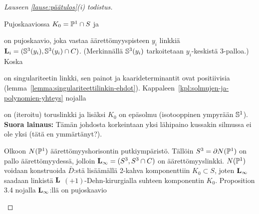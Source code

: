 \begin{proof}[Lauseen \ref{lause:päätulos}(i) todistus]
\begin{center}
    \end{center}
    Pujoskaaviossa $K_0=\P^1\cap S$ ja 
    on pujoskaavio, joka vastaa äärettömyyspisteen $y_i$ linkkiä $\linkki_i=(\S^3(y_i),\S^3(y_i)\cap C)$. (Merkinnällä $\S^3(y_i)$ tarkoitetaan $y_i$-keskistä 3-palloa.) Koska
    on singulariteetin linkki, sen painot ja kaarideterminantit ovat positiivisia (lemma~\ref{lemma:singulariteettilinkin-ehdot}). Kappaleen~\ref{kpl:solmujen-ja-polynomien-yhteys} nojalla
    on (iteroitu) toruslinkki ja lisäksi $K_0$ on epäsolmu (isotooppinen ympyrään $\S^1$). \textbf{Suora lainaus:} Tämän johdosta korkeintaan yksi lähipaino kussakin silmussa ei ole yksi (tätä en ymmärtänyt?).

    Olkoon $N(\P^1)$ äärettömyyshorisontin putkiympäristö. Tällöin $S^3=\partial N(\P^1)$ on pallo äärettömyydessä, jolloin $\linkki_\infty=(S^3,S^3\cap C)$ on äärettömyyslinkki. $N(\P^1)$ voidaan konstruoida $\bar D$:stä lisäämällä 2-kahva komponenttiin $K_0\subset S$, joten $\linkki_\infty$ saadaan linkistä $\linkki$ $(+1)$-Dehn-kirurgialla suhteen komponentin $K_0$. Proposition 3.4 \citep{Neumann1989} nojalla $\linkki_\infty$:llä on pujoskaavio
    \begin{center}
\end{center}
\end{proof}
